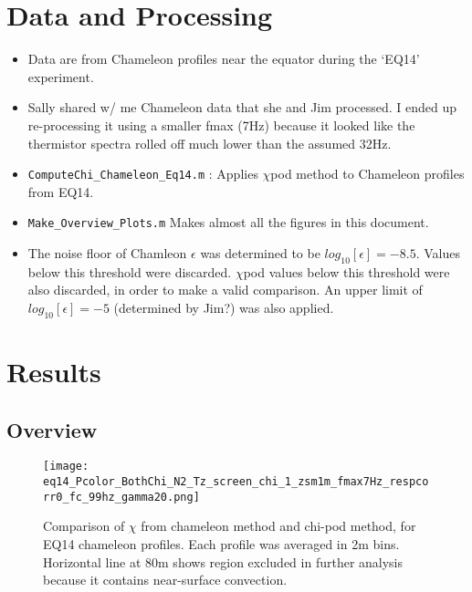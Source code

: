 \documentclass[11pt]{article}
\begin{document}
\clearpage
\section{Data and Processing}

\begin{itemize}

\item Data are from Chameleon profiles near the equator during the `EQ14' experiment.

\item Sally shared w/ me Chameleon data that she and Jim processed. I ended up re-processing it using a smaller fmax (7Hz) because it looked like the thermistor spectra rolled off much lower than the assumed 32Hz.

\item \verb+ComputeChi_Chameleon_Eq14.m+ : Applies $\chi$pod method to Chameleon profiles from EQ14.

\item \verb+Make_Overview_Plots.m+ Makes almost all the figures in this document.

\item The noise floor of Chamleon $\epsilon$ was determined to be $log_{10}[\epsilon]=-8.5$. Values below this threshold were discarded. $\chi$pod values below this threshold were also discarded, in order to make a valid comparison. An upper limit of $log_{10}[\epsilon]=-5$ (determined by Jim?) was also applied.

\end{itemize}




\clearpage
\section{Results}


\subsection{Overview}

\begin{figure}[htbp]
\texttt{[image: eq14\_Pcolor\_BothChi\_N2\_Tz\_screen\_chi\_1\_zsm1m\_fmax7Hz\_respcorr0\_fc\_99hz\_gamma20.png]}
\caption{Comparison of $\chi$ from chameleon method and chi-pod method, for EQ14 chameleon profiles. Each profile was averaged in 2m bins.  Horizontal line at 80m shows region excluded in further analysis because it contains near-surface convection.}
\label{chi_overview}
\end{figure}
\end{document}

